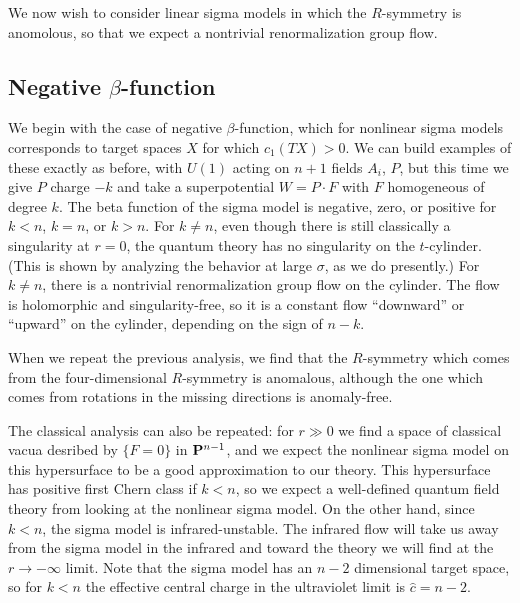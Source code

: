 We now wish to consider linear sigma models in which the $R$-symmetry is
anomolous, so that we expect a nontrivial renormalization group flow.

\subsection{Negative $\beta$-function}

  We begin with the case of negative $\beta$-function, which for
nonlinear sigma models corresponds to target spaces $X$ for which
$c_1(TX)>0$.   We can build examples of these exactly as before, with
$U(1)$ acting on $n+1$ fields $A_i$, $P$, but this
time we give $P$ charge $-k$ and take a superpotential $W=P\cdot F$ with
$F$ homogeneous of degree $k$.   The beta function of the sigma model
is negative, zero, or positive for $k<n$, $k=n$, or $k>n$.
For $k\not= n$, even though there is still classically a singularity
at $r=0$, the quantum theory has no singularity on the $t$-cylinder.
(This is shown by analyzing the behavior at large $\sigma$, as we do
presently.)
For $k\not=n$, there is a nontrivial renormalization group flow on the
cylinder.
The flow is holomorphic and singularity-free, so it is a constant flow
``downward'' or ``upward'' on the cylinder, depending on the sign of $n-k$.

\centerline{\quad}
\centerline{\epsfysize=1.35in}
\centerline{\quad}

When we repeat the previous analysis, we find that the $R$-symmetry which
comes from the four-dimensional $R$-symmetry is anomalous, although the
one which comes from rotations in the missing directions is anomaly-free.

The classical analysis can also be repeated:  for $r\gg0$ we find a space
of classical vacua desribed by $\{F=0\}$ in ${\bf P}^{n-1}$, and we expect
the nonlinear sigma model on this hypersurface to be a good approximation
to our theory.  This hypersurface has positive first Chern class if $k<n$,
so we
expect a well-defined quantum field theory from looking at the nonlinear
sigma model.  On the other hand, since $k<n$, the sigma model
is infrared-unstable.  The infrared flow will take us away from the
sigma model in the infrared  and toward the
 theory we will find
at the $r\to-\infty$ limit.  Note that the sigma model has an $n-2$
dimensional target space, so for $k<n$ the effective central charge
in the ultraviolet limit is $\widehat c=n-2$.

